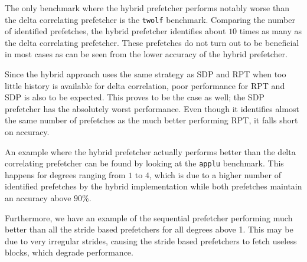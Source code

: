 The only benchmark where the hybrid prefetcher performs notably worse than the
delta correlating prefetcher is the \texttt{twolf} benchmark.
Comparing the number of identified prefetches, the hybrid prefetcher identifies
about $10$ times as many as the delta correlating prefetcher.
These prefetches do not turn out to be beneficial in most cases as can be seen
from the lower accuracy of the hybrid prefetcher.

Since the hybrid approach uses the same strategy as SDP and RPT when too little
history is available for delta correlation, poor performance for RPT and SDP is
also to be expected.
This proves to be the case as well; the SDP prefetcher has the absolutely worst
performance.
Even though it identifies almost the same number of prefetches as the much
better performing RPT, it falls short on accuracy.

An example where the hybrid prefetcher actually performs better than the delta
correlating prefetcher can be found by looking at the \texttt{applu} benchmark.
This happens for degrees ranging from $1$ to $4$, which is due to a higher
number of identified prefetches by the hybrid implementation while both
prefetches maintain an accuracy above $90\%$.

Furthermore, we have an example of the sequential prefetcher performing much
better than all the stride based prefetchers for all degrees above 1.
This may be due to very irregular strides, causing the stride based prefetchers
to fetch useless blocks, which degrade performance.
